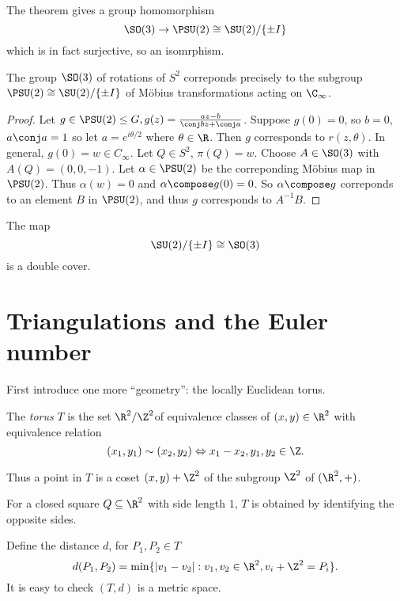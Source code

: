 \documentclass[a4paper]{article}
\theoremstyle{definition}
\begin{document}
The theorem gives a group homomorphism
\[
  \SO(3) \to \PSU(2) \cong \SU(2)/\{\pm I\}
\]
which is in fact surjective, so an isomrphism.

\begin{theorem}
  The group \(\SO(3)\) of rotations of \(S^2\) correponds precisely to the subgroup \(\PSU(2) \cong \SU(2)/\{\pm I\}\) of Möbius transformations acting on \(\C_\infty\).
\end{theorem}

\begin{proof}
  Let \(g \in \PSU(2) \leq G, g(z) = \frac{az - b}{\conj b z + \conj a}\). Suppose \(g(0) = 0\), so \(b = 0\), \(a \conj a = 1\) so let \(a = e^{i\theta/2}\) where \(\theta \in \R\). Then \(g\) corresponds to \(r(z, \theta)\). In general, \(g(0) = w \in C_\infty\). Let \(Q \in S^2\), \(\pi(Q) = w\). Choose \(A \in \SO(3)\) with \(A(Q) = (0, 0, -1)\). Let \(\alpha \in \PSU(2)\) be the correponding Möbius map in \(\PSU(2)\). Thus \(\alpha(w) = 0\) and \(\alpha \compose g(0) = 0\). So \(\alpha \compose g\) correponds to an element \(B\) in \(\PSU(2)\), and thus \(g\) corresponds to \(A^{-1}B\).
\end{proof}

\begin{remark}
  The map
  \[
    \SU(2)/\{\pm I\} \cong \SO(3)
  \]
  is a double cover.
\end{remark}

\section{Triangulations and the Euler number}

First introduce one more ``geometry'': the locally Euclidean torus.

\begin{definition}[Torus]
  The \emph{torus} \(T\) is the set \(\R^2/\Z^2\)of equivalence classes of \((x, y) \in \R^2\) with equivalence relation
  \[
    (x_1, y_1) \sim (x_2, y_2) \Leftrightarrow x_1 - x_2, y_1, y_2 \in \Z.
  \]
\end{definition}

Thus a point in \(T\) is a coset \((x, y) + \Z^2\) of the subgroup \(\Z^2\) of \((\R^2, +)\).

For a closed square \(Q \subseteq \R^2\) with side length \(1\), \(T\) is obtained by identifying the opposite sides.

Define the distance \(d\), for \(P_1, P_2 \in T\)
\[
  d(P_1, P_2) = \min \{|v_1 - v_2|: v_1, v_2 \in \R^2, v_i + \Z^2 = P_i\}.
\]
It is easy to check \((T, d)\) is a metric space.
\end{document}
